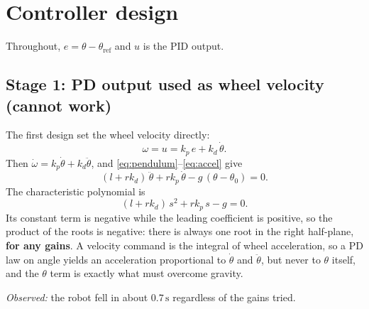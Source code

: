 \documentclass[11pt,a4paper]{article}
\begin{document}
\section{Controller design}
Throughout, $e = \theta - \theta_\mathrm{ref}$ and $u$ is the PID output.

\subsection{Stage 1: PD output used as wheel velocity (cannot work)}
\label{sec:stage1}
The first design set the wheel velocity directly:
\begin{equation}
  \omega = u = k_p\,e + k_d\,\dot\theta .
  \label{eq:stage1}
\end{equation}
Then $\dot\omega = k_p\dot\theta + k_d\ddot\theta$, and
\eqref{eq:pendulum}--\eqref{eq:accel} give
\begin{equation}
  (l + r k_d)\,\ddot\theta + r k_p\,\dot\theta - g\,(\theta-\theta_0) = 0 .
\end{equation}
The characteristic polynomial is
\begin{equation}
  (l + r k_d)\,s^2 + r k_p\,s - g = 0 .
\end{equation}
Its constant term is negative while the leading coefficient is positive, so the
product of the roots is negative: there is always one root in the right
half-plane, \textbf{for any gains}. A velocity command is the integral of
wheel acceleration, so a PD law on angle yields an acceleration proportional
to $\dot\theta$ and $\ddot\theta$, but never to $\theta$ itself, and the
$\theta$ term is exactly what must overcome gravity.

\emph{Observed:} the robot fell in about $0.7\,\mathrm{s}$ regardless of the
gains tried.
\end{document}
